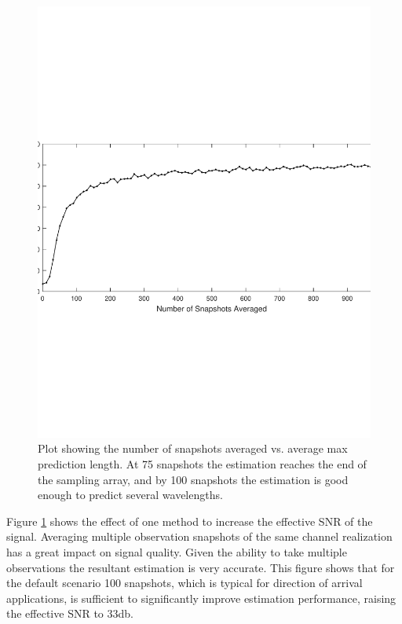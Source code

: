 \documentclass{allertonproc}
\begin{document}
\begin{figure}[tbp]
\begin{center}
\includegraphics[width=6in]{numSnapshots}
\caption{Plot showing the number of snapshots averaged vs. average max prediction length. At 75 snapshots the estimation reaches the end of the sampling array, and by 100 snapshots the estimation is good enough to predict several wavelengths.}\label{snapshot}
\end{center}
\end{figure}
Figure \ref{snapshot} shows the effect of one method to increase the effective SNR of the signal. Averaging multiple observation snapshots of the same channel realization has a great impact on signal quality. Given the ability to take multiple observations the resultant estimation is very accurate. This figure shows that for the default scenario 100 snapshots, which is typical for direction of arrival applications, is sufficient to significantly improve estimation performance, raising the effective SNR to $33$db. 
\end{document}
